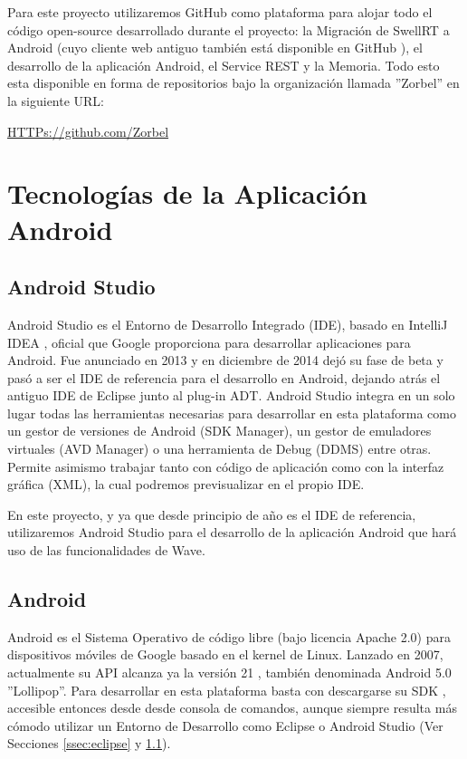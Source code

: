     Para este proyecto utilizaremos GitHub como plataforma para alojar todo el código open-source desarrollado durante el proyecto: la Migración de SwellRT a Android (cuyo cliente web antiguo también está disponible en GitHub \cite{ref:swellRT_github}), el desarrollo de la aplicación Android, el Service REST y la Memoria. Todo esto esta disponible en forma de repositorios bajo la organización llamada ''Zorbel'' en la siguiente URL:
    
    \url{HTTPs://github.com/Zorbel}    

\section{Tecnologías de la Aplicación Android}
    
    \subsection{Android Studio}\label{ssec:androidStudio}
    
	Android Studio \cite{ref:android_studio} es el Entorno de Desarrollo Integrado (IDE), basado en IntelliJ IDEA \cite{ref:intelliJ_Idea}, oficial que Google proporciona para desarrollar aplicaciones para Android. Fue anunciado en 2013 y en diciembre de 2014 dejó su fase de beta y pasó a ser el IDE de referencia para el desarrollo en Android, dejando atrás el antiguo IDE de Eclipse junto al plug-in ADT. Android Studio integra en un solo lugar todas las herramientas necesarias para desarrollar en esta plataforma como un gestor de versiones de Android (SDK Manager), un gestor de emuladores virtuales (AVD Manager) o una herramienta de Debug (DDMS) entre otras. Permite asimismo trabajar tanto con código de aplicación como con la interfaz gráfica (XML), la cual podremos previsualizar en el propio IDE.
	
	En este proyecto, y ya que desde principio de año es el IDE de referencia, utilizaremos Android Studio para el desarrollo de la aplicación Android que hará uso de las funcionalidades de Wave.
    
    \subsection{Android}\label{ssec:android}
    
	Android \cite{ref:android_platform} es el Sistema Operativo de código libre (bajo licencia Apache 2.0) para dispositivos móviles de Google basado en el kernel de Linux. Lanzado en 2007, actualmente su API alcanza ya la versión 21 \cite{ref:android_api21}, también denominada Android 5.0 ''Lollipop''. Para desarrollar en esta plataforma basta con descargarse su SDK \cite{ref:android_sdk}, accesible entonces desde desde consola de comandos, aunque siempre resulta más cómodo utilizar un Entorno de Desarrollo como Eclipse o Android Studio (Ver Secciones \ref{ssec:eclipse} y \ref{ssec:androidStudio}).
	
